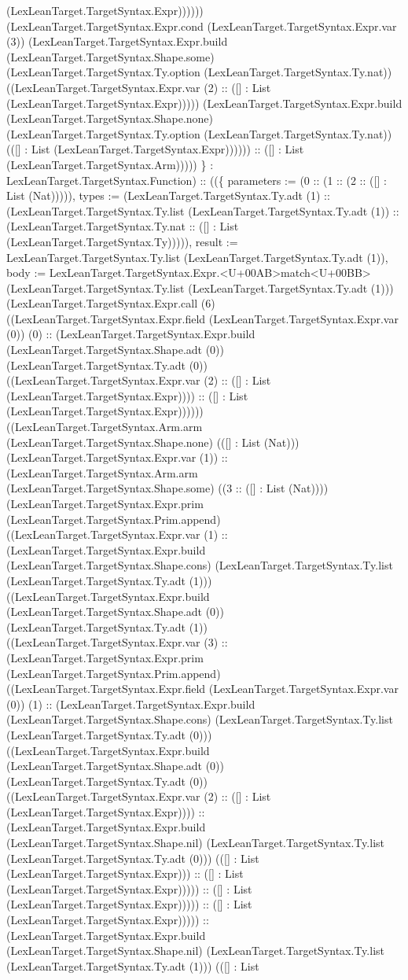 \documentclass[11pt]{article}
\begin{document}
(LexLeanTarget.TargetSyntax.Expr)))))) (LexLeanTarget.TargetSyntax.Expr.cond (LexLeanTarget.TargetSyntax.Expr.var (3)) (LexLeanTarget.TargetSyntax.Expr.build (LexLeanTarget.TargetSyntax.Shape.some) (LexLeanTarget.TargetSyntax.Ty.option (LexLeanTarget.TargetSyntax.Ty.nat)) ((LexLeanTarget.TargetSyntax.Expr.var (2) :: ([] : List (LexLeanTarget.TargetSyntax.Expr))))) (LexLeanTarget.TargetSyntax.Expr.build (LexLeanTarget.TargetSyntax.Shape.none) (LexLeanTarget.TargetSyntax.Ty.option (LexLeanTarget.TargetSyntax.Ty.nat)) (([] : List (LexLeanTarget.TargetSyntax.Expr)))))) :: ([] : List (LexLeanTarget.TargetSyntax.Arm))))) \} : LexLeanTarget.TargetSyntax.Function) :: ((\{ parameters := (0 :: (1 :: (2 :: ([] : List (Nat))))), types := (LexLeanTarget.TargetSyntax.Ty.adt (1) :: (LexLeanTarget.TargetSyntax.Ty.list (LexLeanTarget.TargetSyntax.Ty.adt (1)) :: (LexLeanTarget.TargetSyntax.Ty.nat :: ([] : List (LexLeanTarget.TargetSyntax.Ty))))), result := LexLeanTarget.TargetSyntax.Ty.list (LexLeanTarget.TargetSyntax.Ty.adt (1)), body := LexLeanTarget.TargetSyntax.Expr.<U+00AB>match<U+00BB> (LexLeanTarget.TargetSyntax.Ty.list (LexLeanTarget.TargetSyntax.Ty.adt (1))) (LexLeanTarget.TargetSyntax.Expr.call (6) ((LexLeanTarget.TargetSyntax.Expr.field (LexLeanTarget.TargetSyntax.Expr.var (0)) (0) :: (LexLeanTarget.TargetSyntax.Expr.build (LexLeanTarget.TargetSyntax.Shape.adt (0)) (LexLeanTarget.TargetSyntax.Ty.adt (0)) ((LexLeanTarget.TargetSyntax.Expr.var (2) :: ([] : List (LexLeanTarget.TargetSyntax.Expr)))) :: ([] : List (LexLeanTarget.TargetSyntax.Expr)))))) ((LexLeanTarget.TargetSyntax.Arm.arm (LexLeanTarget.TargetSyntax.Shape.none) (([] : List (Nat))) (LexLeanTarget.TargetSyntax.Expr.var (1)) :: (LexLeanTarget.TargetSyntax.Arm.arm (LexLeanTarget.TargetSyntax.Shape.some) ((3 :: ([] : List (Nat)))) (LexLeanTarget.TargetSyntax.Expr.prim (LexLeanTarget.TargetSyntax.Prim.append) ((LexLeanTarget.TargetSyntax.Expr.var (1) :: (LexLeanTarget.TargetSyntax.Expr.build (LexLeanTarget.TargetSyntax.Shape.cons) (LexLeanTarget.TargetSyntax.Ty.list (LexLeanTarget.TargetSyntax.Ty.adt (1))) ((LexLeanTarget.TargetSyntax.Expr.build (LexLeanTarget.TargetSyntax.Shape.adt (0)) (LexLeanTarget.TargetSyntax.Ty.adt (1)) ((LexLeanTarget.TargetSyntax.Expr.var (3) :: (LexLeanTarget.TargetSyntax.Expr.prim (LexLeanTarget.TargetSyntax.Prim.append) ((LexLeanTarget.TargetSyntax.Expr.field (LexLeanTarget.TargetSyntax.Expr.var (0)) (1) :: (LexLeanTarget.TargetSyntax.Expr.build (LexLeanTarget.TargetSyntax.Shape.cons) (LexLeanTarget.TargetSyntax.Ty.list (LexLeanTarget.TargetSyntax.Ty.adt (0))) ((LexLeanTarget.TargetSyntax.Expr.build (LexLeanTarget.TargetSyntax.Shape.adt (0)) (LexLeanTarget.TargetSyntax.Ty.adt (0)) ((LexLeanTarget.TargetSyntax.Expr.var (2) :: ([] : List (LexLeanTarget.TargetSyntax.Expr)))) :: (LexLeanTarget.TargetSyntax.Expr.build (LexLeanTarget.TargetSyntax.Shape.nil) (LexLeanTarget.TargetSyntax.Ty.list (LexLeanTarget.TargetSyntax.Ty.adt (0))) (([] : List (LexLeanTarget.TargetSyntax.Expr))) :: ([] : List (LexLeanTarget.TargetSyntax.Expr))))) :: ([] : List (LexLeanTarget.TargetSyntax.Expr))))) :: ([] : List (LexLeanTarget.TargetSyntax.Expr))))) :: (LexLeanTarget.TargetSyntax.Expr.build (LexLeanTarget.TargetSyntax.Shape.nil) (LexLeanTarget.TargetSyntax.Ty.list (LexLeanTarget.TargetSyntax.Ty.adt (1))) (([] : List 
\end{document}
